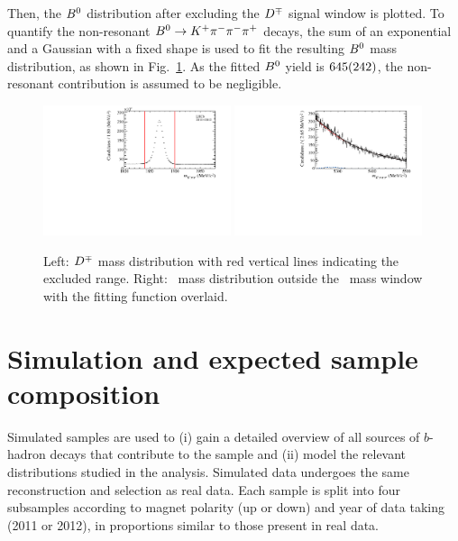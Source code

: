 %
Then, the $B^0$ distribution after excluding the $D^\mp$ signal
window is plotted. To quantify the non-resonant $B^0\rightarrow K^+\pi^-\pi^-\pi^+$ decays, the
sum of an exponential and a Gaussian with a fixed shape is used to fit the resulting $B^0$ mass
distribution, as shown in Fig.~\ref{fig:NonResonant_DmassCut}. As the fitted
$B^0$ yield is $\num{645\pm242}$, the non-resonant contribution is
assumed to be negligible.
\begin{figure}[t]
	\begin{center}
		\includegraphics[width=0.49\textwidth]{02Selection/figs/DmassCut.pdf}
		\includegraphics[width=0.49\textwidth]{02Selection/figs/Resulting_Bmass.pdf}
	\end{center}
        \vspace{-2mm}
	\caption{Left: $D^\mp$ mass distribution with red vertical lines indicating the
	excluded range. Right:
	\Bz~mass distribution outside the \Dmp~mass window with the fitting function overlaid.}
	\label{fig:NonResonant_DmassCut}
\end{figure}

\section{Simulation and expected sample composition}
\label{sec:MC}

Simulated samples are used to (i) gain a detailed overview of all sources of
$b$-hadron decays that contribute to the sample and (ii) model the relevant
distributions studied in the analysis. Simulated data undergoes the same
reconstruction and selection as real data. Each sample
is split into four subsamples according to magnet polarity (up or down) and year of data taking (2011 or 2012),
in proportions similar to those present in real data.

